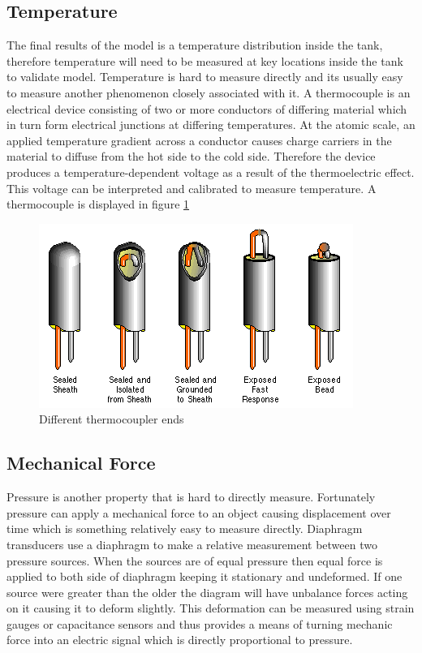 \documentclass[paper=a4, fontsize=11pt, abstract=on]{scrartcl}
\numberwithin{equation}{section}		%
\numberwithin{figure}{section}			%
\numberwithin{table}{section}				%
\begin{document}
\subsection{Temperature}
The final results of the model is a temperature distribution inside the tank, therefore temperature will need to be measured at key locations inside the tank to validate model. Temperature is hard to measure directly and its usually easy to measure another phenomenon closely associated with it. A thermocouple is an electrical device consisting of two or more conductors of differing material which in turn form electrical junctions at differing temperatures.  At the atomic scale, an applied temperature gradient across a conductor causes charge carriers in the material to diffuse from the hot side to the cold side. Therefore the device produces a temperature-dependent voltage as a result of the thermoelectric effect. This voltage can be interpreted and calibrated to measure temperature. A thermocouple is displayed in figure \ref{therm}

\begin{figure}[H]
\centering
\includegraphics[width=0.5\linewidth]{thermom}
\caption{Different thermocoupler ends}
\label{therm}
\end{figure}

\subsection{Mechanical Force}
Pressure is another property that is hard to directly measure. Fortunately pressure can apply a mechanical force to an object causing displacement over time which is something relatively easy to measure directly. Diaphragm transducers use a diaphragm to make a relative measurement between two pressure sources. When the sources are of equal pressure then equal force is applied to both side of diaphragm keeping it stationary and undeformed. If one source were greater than the older the diagram will have unbalance forces acting on it causing it to deform slightly. This deformation can be measured using strain gauges or capacitance sensors and thus provides a means of turning mechanic force into an electric signal which is directly proportional to pressure.
\end{document}
